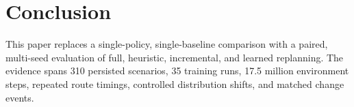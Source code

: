 \section{Conclusion}

This paper replaces a single-policy, single-baseline comparison with a paired,
multi-seed evaluation of full, heuristic, incremental, and learned replanning.
The evidence spans 310 persisted scenarios, 35 training runs, 17.5 million
environment steps, repeated route timings, controlled distribution shifts, and
matched change events.


